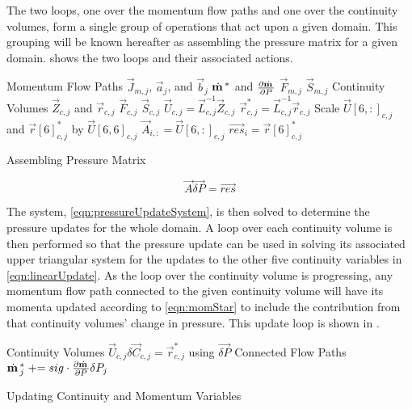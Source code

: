The two loops, one over the momentum flow paths and one over the continuity volumes, form a single group of operations that act upon a given domain.
This grouping will be known hereafter as assembling the pressure matrix for a given domain.
 shows the two loops and their associated actions.

\begin{algo}[ht!]
\setlength{\baselineskip}{0.625\baselineskip}
\begin{algorithmic}[1]
\Loop \; Momentum Flow Paths
	\Calculate $\vec{J}_{m, j}$, $\vec{a}_{j}$, and $\vec{b}_{j}$
	\Calculate $\momVec{}^{*}$ and $\frac{\partial \momVec{}}{\partial P}$
	\Calculate $\vec{F}_{m, j}$	
	\Calculate $\vec{S}_{m, j}$	
\EndLoop
\Loop \; Continuity Volumes
   	\Calculate $\vec{Z}_{c,j}$ and $\vec{r}_{c, j}$
 	\Calculate $\vec{F}_{c, j}$	
	\Calculate $\vec{S}_{c, j}$	
   	\Calculate $\vec{U}_{c, j} = \vec{L}_{c, j}^{-1} \vec{Z}_{c, j}$
   	\Calculate $\vec{r}^{*}_{c, j} = \vec{L}_{c, j}^{-1} \vec{r}_{c, j}$
   	\Set Scale $\vec{U}[6, :]_{c, j}$ and $\vec{r}[6]^{*}_{c, j}$ by $\vec{U}[6,6]_{c, j}$
   	\Set $\vec{A}_{i, :} = \vec{U}[6,:]_{c, j}$
   	\Set $\vec{res}_{i} = \vec{r}[6]^{*}_{c, j}$
\EndLoop
\end{algorithmic}
\caption{Assembling Pressure Matrix}
\label{alg:xschem}
\end{algo}

\begin{equation}
\label{eqn:pressureUpdateSystem}
\vec{A} \vec{\delta P} = \vec{res}
\end{equation}

The system, \eqref{eqn:pressureUpdateSystem}, is then solved to determine the pressure updates for the whole domain.
A loop over each continuity volume is then performed so that the pressure update can be used in solving its associated upper triangular system for the updates to the other five continuity variables in \eqref{eqn:linearUpdate}.
As the loop over the continuity volume is progressing, any momentum flow path connected to the given continuity volume will have its momenta updated according to \eqref{eqn:momStar} to include the contribution from that continuity volumes' change in pressure. 
This update loop is shown in .

\begin{algo}[ht!]
\setlength{\baselineskip}{0.625\baselineskip}
\begin{algorithmic}[1]
\Loop \; Continuity Volumes
	\Solve $\vec{U}_{c, j} \delta \vec{C}_{c, j} = \vec{r}^{*}_{c, j}$ using $\vec{\delta P}$		
	\Loop \; Connected Flow Paths
		\Set $\momVec{}^{*}_{j} \pluseq sig \cdot \frac{\partial \momVec{}}{\partial P} \delta P_{j}$
	\EndLoop
\EndLoop
\end{algorithmic}
\caption{Updating Continuity and Momentum Variables}
\label{alg:updateVariables}
\end{algo}

